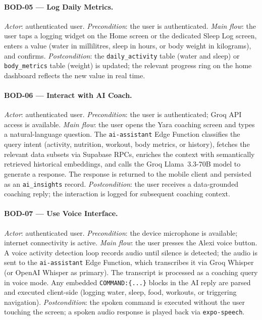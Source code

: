 \paragraph{BOD-05 — Log Daily Metrics.}
\textit{Actor}: authenticated user.
\textit{Precondition}: the user is authenticated.
\textit{Main flow}: the user taps a logging widget on the Home screen or
the dedicated Sleep Log screen, enters a value (water in millilitres, sleep
in hours, or body weight in kilograms), and confirms.
\textit{Postcondition}: the \texttt{daily\_activity} table (water and
sleep) or \texttt{body\_metrics} table (weight) is updated; the relevant
progress ring on the home dashboard reflects the new value in real time.

\paragraph{BOD-06 — Interact with AI Coach.}
\textit{Actor}: authenticated user.
\textit{Precondition}: the user is authenticated; Groq API access is
available.
\textit{Main flow}: the user opens the Yara coaching screen and types a
natural-language question. The \texttt{ai-assistant} Edge Function
classifies the query intent (activity, nutrition, workout, body metrics, or
history), fetches the relevant data subsets via Supabase RPCs, enriches the
context with semantically retrieved historical embeddings, and calls the
Groq Llama~3.3-70B model to generate a response. The response is returned
to the mobile client and persisted as an \texttt{ai\_insights} record.
\textit{Postcondition}: the user receives a data-grounded coaching reply;
the interaction is logged for subsequent coaching context.

\paragraph{BOD-07 — Use Voice Interface.}
\textit{Actor}: authenticated user.
\textit{Precondition}: the device microphone is available; internet
connectivity is active.
\textit{Main flow}: the user presses the Alexi voice button. A voice
activity detection loop records audio until silence is detected; the audio
is sent to the \texttt{ai-assistant} Edge Function, which transcribes it
via Groq Whisper (or OpenAI Whisper as primary). The transcript is
processed as a coaching query in voice mode. Any embedded
\texttt{COMMAND:\{...\}} blocks in the AI reply are parsed and executed
client-side (logging water, sleep, food, workouts, or triggering
navigation).
\textit{Postcondition}: the spoken command is executed without the user
touching the screen; a spoken audio response is played back via
\texttt{expo-speech}.

